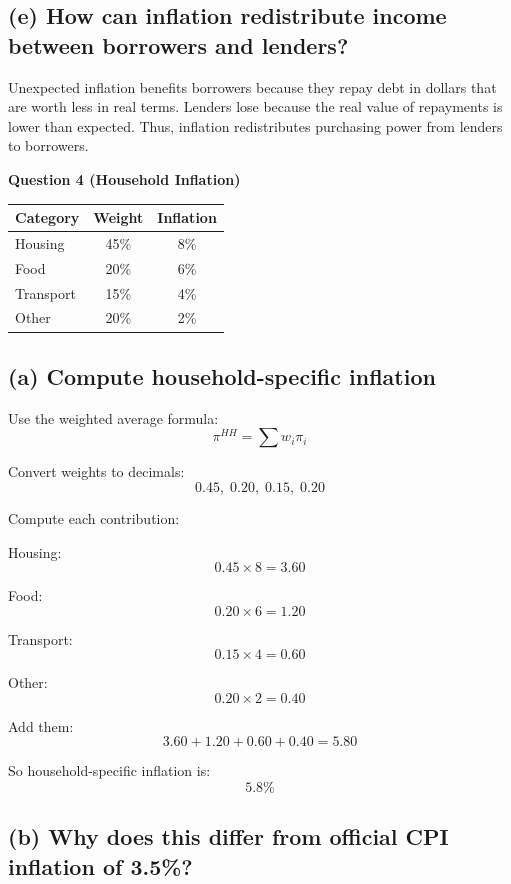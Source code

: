 \documentclass[12pt]{article}
\begin{document}
\subsection*{(e) How can inflation redistribute income between borrowers and lenders?}

Unexpected inflation benefits borrowers because they repay debt in dollars that are worth less in real terms. Lenders lose because the real value of repayments is lower than expected. Thus, inflation redistributes purchasing power from lenders to borrowers.

\textbf{Question 4 (Household Inflation)}

\begin{center}
\begin{tabular}{lcc}
\toprule
Category & Weight & Inflation \\
\midrule
Housing & 45\% & 8\% \\
Food & 20\% & 6\% \\
Transport & 15\% & 4\% \\
Other & 20\% & 2\% \\
\bottomrule
\end{tabular}
\end{center}

\subsection*{(a) Compute household-specific inflation}

Use the weighted average formula:
\[
\pi^{HH} = \sum w_i \pi_i
\]

Convert weights to decimals:
\[
0.45,\; 0.20,\; 0.15,\; 0.20
\]

Compute each contribution:

Housing:
\[
0.45 \times 8 = 3.60
\]

Food:
\[
0.20 \times 6 = 1.20
\]

Transport:
\[
0.15 \times 4 = 0.60
\]

Other:
\[
0.20 \times 2 = 0.40
\]

Add them:
\[
3.60 + 1.20 + 0.60 + 0.40 = 5.80
\]

So household-specific inflation is:
\[
\boxed{5.8\%}
\]

\subsection*{(b) Why does this differ from official CPI inflation of 3.5\%?}
\end{document}
